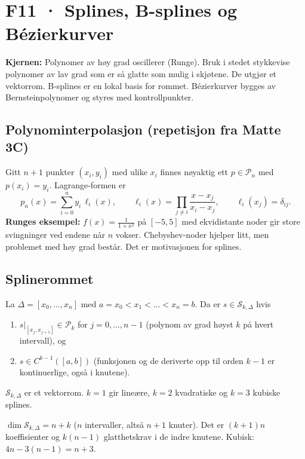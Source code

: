 \section{F11 · Splines, B-splines og Bézierkurver}

\textbf{Kjernen:} Polynomer av høy grad oscillerer (Runge). Bruk i stedet stykkevise polynomer av lav grad som er så glatte som mulig i skjøtene. De utgjør et vektorrom. B-splines er en lokal basis for rommet. Bézierkurver bygges av Bernsteinpolynomer og styres med kontrollpunkter.

\subsection{Polynominterpolasjon (repetisjon fra Matte 3C)}
Gitt $n+1$ punkter $(x_i,y_i)$ med ulike $x_i$ finnes nøyaktig ett $p\in\mathcal P_n$ med $p(x_i)=y_i$. Lagrange-formen er
\[
p_n(x)=\sum_{i=0}^ny_i\,\ell_i(x),\qquad \ell_i(x)=\prod_{j\neq i}\frac{x-x_j}{x_i-x_j},\qquad \ell_i(x_j)=\delta_{ij}.
\]
\textbf{Runges eksempel:} $f(x)=\frac1{1+x^2}$ på $[-5,5]$ med ekvidistante noder gir store svingninger ved endene når $n$ vokser. Chebyshev-noder hjelper litt, men problemet med høy grad består. Det er motivasjonen for splines.

\subsection{Splinerommet}
\begin{defn}
La $\Delta=[x_0,\dots,x_n]$ med $a=x_0<x_1<\dots<x_n=b$. Da er $s\in\mathcal S_{k,\Delta}$ hvis
\begin{enumerate}
  \item $s|_{[x_j,x_{j+1}]}\in\mathcal P_k$ for $j=0,\dots,n-1$ (polynom av grad høyst $k$ på hvert intervall), og
  \item $s\in C^{k-1}([a,b])$ (funksjonen og de deriverte opp til orden $k-1$ er kontinuerlige, også i knutene).
\end{enumerate}
$\mathcal S_{k,\Delta}$ er et vektorrom. $k=1$ gir lineære, $k=2$ kvadratiske og $k=3$ kubiske splines.
\end{defn}
\begin{teorem}[dimensjon]
$\dim\mathcal S_{k,\Delta}=n+k$ ($n$ intervaller, altså $n+1$ knuter). Det er $(k+1)n$ koeffisienter og $k(n-1)$ glatthetskrav i de indre knutene. Kubisk: $4n-3(n-1)=n+3$.
\end{teorem}

